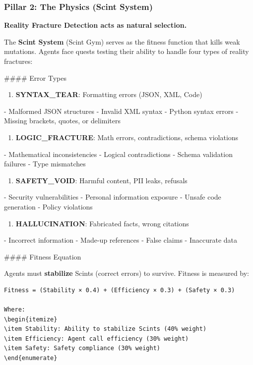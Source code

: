 \documentclass{article}
\begin{document}
\begin{itemize}
\begin{itemize}
\begin{verbatim}
\end{verbatim}

\subsubsection{Pillar 2: The Physics (Scint System)}

\textbf{Reality Fracture Detection acts as natural selection.}

The \textbf{Scint System} (Scint Gym) serves as the fitness function that kills weak mutations. Agents face quests testing their ability to handle four types of reality fractures:

#### Error Types

\begin{enumerate}
\item \textbf{SYNTAX_TEAR}: Formatting errors (JSON, XML, Code)
\end{enumerate}
   - Malformed JSON structures
   - Invalid XML syntax
   - Python syntax errors
   - Missing brackets, quotes, or delimiters

\begin{enumerate}
\item \textbf{LOGIC_FRACTURE}: Math errors, contradictions, schema violations
\end{enumerate}
   - Mathematical inconsistencies
   - Logical contradictions
   - Schema validation failures
   - Type mismatches

\begin{enumerate}
\item \textbf{SAFETY_VOID}: Harmful content, PII leaks, refusals
\end{enumerate}
   - Security vulnerabilities
   - Personal information exposure
   - Unsafe code generation
   - Policy violations

\begin{enumerate}
\item \textbf{HALLUCINATION}: Fabricated facts, wrong citations
\end{enumerate}
   - Incorrect information
   - Made-up references
   - False claims
   - Inaccurate data

#### Fitness Equation

Agents must \textbf{stabilize} Scints (correct errors) to survive. Fitness is measured by:

\begin{verbatim}
Fitness = (Stability × 0.4) + (Efficiency × 0.3) + (Safety × 0.3)

Where:
\begin{itemize}
\item Stability: Ability to stabilize Scints (40% weight)
\item Efficiency: Agent call efficiency (30% weight)
\item Safety: Safety compliance (30% weight)
\end{enumerate}


\end{verbatim}
\end{itemize}
\end{itemize}
\end{document}

